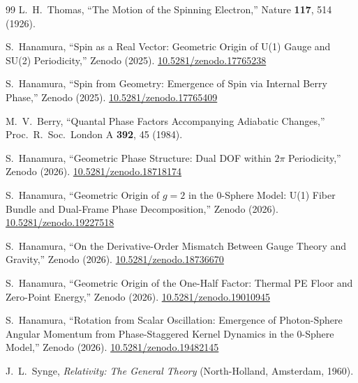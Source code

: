 \documentclass[%
 reprint, amsmath,amssymb, aps, prb, ]{revtex4-2}
\numberwithin{equation}{section}
\begin{document}
\begin{thebibliography}{99}
 L.~H.~Thomas, ``The Motion of the Spinning Electron,'' Nature \textbf{117}, 514 (1926).

 S.~Hanamura, ``Spin as a Real Vector: Geometric Origin of U(1) Gauge and SU(2) Periodicity,'' Zenodo (2025). \href{https://doi.org/10.5281/zenodo.17765238}{10.5281/zenodo.17765238}

 S.~Hanamura, ``Spin from Geometry: Emergence of Spin via Internal Berry Phase,'' Zenodo (2025). \href{https://doi.org/10.5281/zenodo.17765409}{10.5281/zenodo.17765409}

 M.~V.~Berry, ``Quantal Phase Factors Accompanying Adiabatic Changes,'' Proc.\ R.\ Soc.\ London A \textbf{392}, 45 (1984).

 S.~Hanamura, ``Geometric Phase Structure: Dual DOF within $2\pi$ Periodicity,'' Zenodo (2026). \href{https://doi.org/10.5281/zenodo.18718174}{10.5281/zenodo.18718174}

 S.~Hanamura, ``Geometric Origin of $g=2$ in the 0-Sphere Model: U(1) Fiber Bundle and Dual-Frame Phase Decomposition,'' Zenodo (2026). \href{https://doi.org/10.5281/zenodo.19227518}{10.5281/zenodo.19227518}

 S.~Hanamura, ``On the Derivative-Order Mismatch Between Gauge Theory and Gravity,'' Zenodo (2026). \href{https://doi.org/10.5281/zenodo.18736670}{10.5281/zenodo.18736670}

 S.~Hanamura, ``Geometric Origin of the One-Half Factor: Thermal PE Floor and Zero-Point Energy,'' Zenodo (2026). \href{https://doi.org/10.5281/zenodo.19010945}{10.5281/zenodo.19010945}

 S.~Hanamura, ``Rotation from Scalar Oscillation: Emergence of Photon-Sphere Angular Momentum from Phase-Staggered Kernel Dynamics in the 0-Sphere Model,'' Zenodo (2026). \href{https://doi.org/10.5281/zenodo.19482145}{10.5281/zenodo.19482145}

 J.~L.~Synge, \textit{Relativity: The General Theory} (North-Holland, Amsterdam, 1960).


\end{thebibliography}
\end{document}

